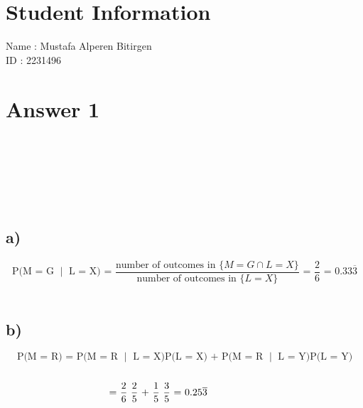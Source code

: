 \documentclass[11pt]{article}
\begin{document}
\section*{Student Information}

Name : Mustafa Alperen Bitirgen\\

ID : 2231496\\


\section*{Answer 1}
\\
\\
\vspace*{0.2cm}\\
\\
\\
\subsection*{a)}
\[\text{P(M = G $\mid$ L = X) = $\frac{\text{number of outcomes in } \{M = G \cap L = X\}}{\text{number of outcomes in }\{L = X\}}$ = $\frac{2}{6}$ = 0.33$\overline{3}$} \]\\
\subsection*{b)}
\[\text{P(M = R) = P(M = R $\mid$ L = X)P(L = X) + P(M = R $\mid$ L = Y)P(L = Y)}\]\\
\[\hspace*{-2cm} \text{ = $\frac{2}{6}$ $\frac{2}{5}$ + $\frac{1}{5}$ $\frac{3}{5}$ = 0.25$\overline{3}$}\]\\
\end{document}
